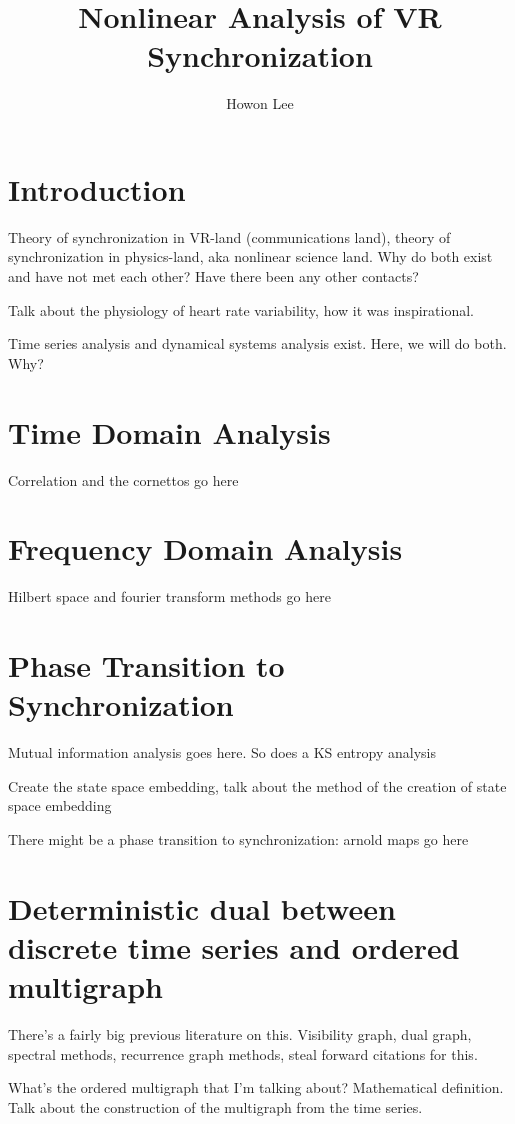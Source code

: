 \documentclass[12pt]{article}
\begin{document}
\title{Nonlinear Analysis of VR Synchronization}
\author{Howon Lee}
\maketitle

\section{Introduction}
Theory of synchronization in VR-land (communications land), theory of synchronization in physics-land, aka nonlinear science land. Why do both exist and have not met each other? Have there been any other contacts?

Talk about the physiology of heart rate variability, how it was inspirational.

Time series analysis and dynamical systems analysis exist. Here, we will do both. Why?

\section{Time Domain Analysis}
Correlation and the cornettos go here
\section{Frequency Domain Analysis}
Hilbert space and fourier transform methods go here

\section{Phase Transition to Synchronization}
Mutual information analysis goes here. So does a KS entropy analysis

Create the state space embedding, talk about the method of the creation of state space embedding

There might be a phase transition to synchronization: arnold maps go here

\section{Deterministic dual between discrete time series and ordered multigraph}

There's a fairly big previous literature on this. Visibility graph, dual graph, spectral methods, recurrence graph methods, steal forward citations for this.

What's the ordered multigraph that I'm talking about? Mathematical definition. Talk about the construction of the multigraph from the time series.
\end{document}

